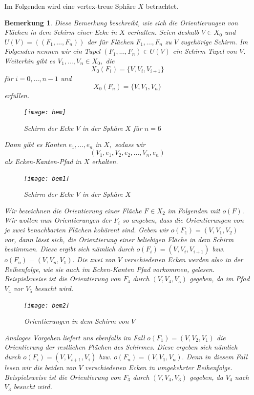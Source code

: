 \documentclass[12pt,titlepage,twoside,cleardoublepage]{article}
\theoremstyle{nummermitklammern}
\newtheorem{bemerkung}[temp]{Bemerkung}
\newtheorem{bemerkung}[zahl]{Bemerkung}
\numberwithin{equation}{section}
\begin{document}
Im Folgenden wird eine vertex-treue Sphäre $X$ betrachtet.
\begin{bemerkung}\label{tup}
Diese Bemerkung beschreibt, wie sich die Orientierungen von Flächen in dem Schirm einer Ecke in $X$ verhalten.
 Seien deshalb $V\in X_0$ und $U(V)=((F_1,\ldots,F_n))$ der für Flächen $F_1,\ldots,F_n$ zu $V$ zugehörige Schirm. Im Folgenden nennen wir ein Tupel $(F_1,\ldots,F_n)\in U(V)$ ein \emph{Schirm-Tupel} von $V$. Weiterhin gibt es $V_1,\ldots,V_n\in X_0,$ die 
\[
X_0(F_i)=\{V,V_i,V_{i+1}\}
\] 
für $i=0,\ldots,n-1$ und 
\[
X_0(F_n)=\{V,V_{1},V_{n}\}
\] erfüllen.
\begin{figure}[H]
\begin{center}
\texttt{[image: bem]}
\end{center}
\caption{Schirm der Ecke $V$ in der Sphäre $X$ für $n=6$}
\end{figure}
Dann gibt es Kanten $e_1,\ldots,e_n$ in $X,$ sodass wir 
\[
(V_1,e_1,V_2,e_2,\ldots,V_n,e_n)
\] 
als Ecken-Kanten-Pfad in $X$ erhalten. 
\begin{figure}[H]
\begin{center}
\texttt{[image: bem1]}
\end{center}
\caption{Schirm der Ecke $V$ in der Sphäre $X$}
\end{figure}
Wir bezeichnen die Orientierung einer Fläche $F\in X_2$ im Folgenden mit $o(F).$ Wir wollen nun Orientierungen der $F_i$ so angeben, dass die Orientierungen von je zwei benachbarten Flächen kohärent sind. 
Geben wir $o(F_1)=(V,V_1,V_2)$ vor, dann lässt sich, die Orientierung einer beliebigen Fläche in dem Schirm bestimmen. Diese ergibt sich nämlich durch $o(F_i)=(V,V_i,V_{i+1})$ bzw. $o(F_n)=(V,V_n,V_1).$ Die zwei von $V$ verschiedenen Ecken werden also in der Reihenfolge, wie sie auch im Ecken-Kanten Pfad vorkommen, gelesen. Beispielsweise ist die Orientierung von $F_4$ durch $(V,V_4,V_5)$ gegeben, da im Pfad $V_4$ vor $V_5 $ besucht wird. 
\begin{figure}[H]
\begin{center}
\texttt{[image: bem2]}
\end{center}
\caption{Orientierungen in dem Schirm von $V$}
\end{figure}
Analoges Vorgehen liefert uns ebenfalls im Fall $o(F_1)=(V,V_2,V_1)$ die Orientierung der restlichen Flächen des Schirmes. Diese ergeben sich nämlich durch $o(F_i)=(V,V_{i+1},V_{i})$ bzw. $o(F_n)=(V,V_1,V_n).$ Denn in diesem Fall lesen wir die beiden von $V$ verschiedenen Ecken in umgekehrter Reihenfolge. Beispielsweise ist die Orientierung von $F_3$ durch $(V,V_4,V_3)$ gegeben, da $V_4$ nach $V_3$ besucht wird.

\end{bemerkung}
\end{document}
